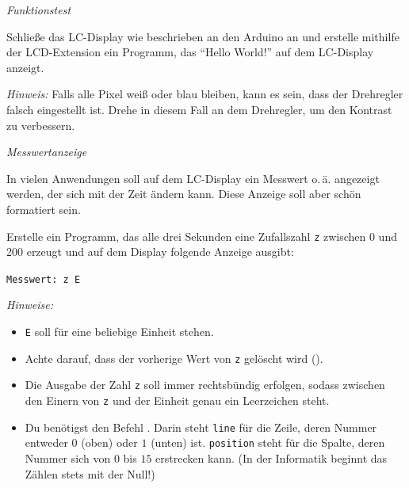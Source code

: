 \bigskip
\begin{aufgabe}\emph{Funktionstest}
			
	Schließe das LC-Display wie beschrieben an den Arduino an und erstelle mithilfe der LCD-Extension ein Programm, das \enquote{Hello World!} auf dem LC-Display anzeigt.
	
	\emph{Hinweis:} Falls alle Pixel weiß oder blau bleiben, kann es sein, dass der Drehregler falsch eingestellt ist. Drehe in diesem Fall an dem Drehregler, um den Kontrast zu verbessern.
\end{aufgabe}
%		
%		

\newpage
\restoregeometry
\onehalfspacing
\begin{aufgabe} \emph{Messwertanzeige}
	
	In vielen Anwendungen soll auf dem LC-Display ein Messwert o.\,ä. angezeigt werden, der sich mit der Zeit ändern kann. Diese Anzeige soll aber schön formatiert sein.
	
	Erstelle ein Programm, das alle drei Sekunden eine Zufallszahl \texttt{z} zwischen 0 und 200 erzeugt und auf dem Display folgende Anzeige ausgibt:
	
	\begin{center}
		\texttt{Messwert: z E}
	\end{center}
	
	\emph{Hinweise:}
	\begin{itemize}[itemsep=0mm, parsep=0mm]
		\item \texttt{E} soll für eine beliebige Einheit stehen.
		\item Achte darauf, dass der vorherige Wert von \texttt{z} gelöscht wird ().
		\item Die Ausgabe der Zahl \texttt{z} soll immer rechtsbündig erfolgen, sodass zwischen den Einern von \texttt{z} und der Einheit genau ein Leerzeichen steht.
		\item Du benötigst den Befehl . Darin steht \texttt{line} für die Zeile, deren Nummer entweder $0$ (oben) oder $1$ (unten) ist. \texttt{position} steht für die Spalte, deren Nummer sich von $0$ bis $15$ erstrecken kann. (In der Informatik beginnt das Zählen stets mit der Null!)		
	\end{itemize}
\end{aufgabe}

